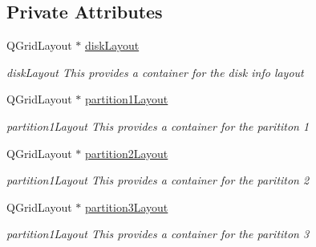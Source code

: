 \subsection*{Private Attributes}
\begin{DoxyCompactItemize}
\item 
\mbox{\label{classui_1_1window_1_1_disk_info_aeafc105508e39cb65fa96cfab0952767}} 
Q\+Grid\+Layout $\ast$ \mbox{\hyperlink{classui_1_1window_1_1_disk_info_aeafc105508e39cb65fa96cfab0952767}{disk\+Layout}}
\begin{DoxyCompactList}\small\item\em disk\+Layout This provides a container for the disk info layout \end{DoxyCompactList}\item 
\mbox{\label{classui_1_1window_1_1_disk_info_a4f88b60bcb68c4501190811842c24ccf}} 
Q\+Grid\+Layout $\ast$ \mbox{\hyperlink{classui_1_1window_1_1_disk_info_a4f88b60bcb68c4501190811842c24ccf}{partition1\+Layout}}
\begin{DoxyCompactList}\small\item\em partition1\+Layout This provides a container for the parititon 1 \end{DoxyCompactList}\item 
\mbox{\label{classui_1_1window_1_1_disk_info_aa51f73e26e08b76b31db591c52b2f533}} 
Q\+Grid\+Layout $\ast$ \mbox{\hyperlink{classui_1_1window_1_1_disk_info_aa51f73e26e08b76b31db591c52b2f533}{partition2\+Layout}}
\begin{DoxyCompactList}\small\item\em partition1\+Layout This provides a container for the parititon 2 \end{DoxyCompactList}\item 
\mbox{\label{classui_1_1window_1_1_disk_info_a8d335504811b65dcc19a1f6014508857}} 
Q\+Grid\+Layout $\ast$ \mbox{\hyperlink{classui_1_1window_1_1_disk_info_a8d335504811b65dcc19a1f6014508857}{partition3\+Layout}}
\begin{DoxyCompactList}\small\item\em partition1\+Layout This provides a container for the parititon 3 \end{DoxyCompactList}\item 

\end{DoxyCompactItemize}
